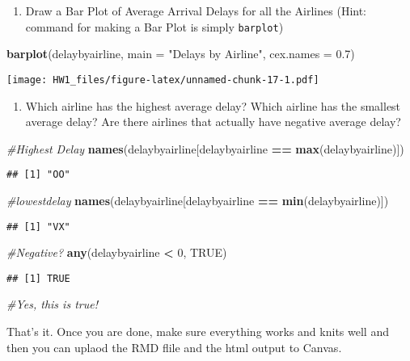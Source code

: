 \documentclass[]{article}
\newenvironment{Shaded}{\begin{snugshade}}{\end{snugshade}}
\newcommand{\KeywordTok}[1]{\textcolor[rgb]{0.13,0.29,0.53}{\textbf{#1}}}
\newcommand{\DataTypeTok}[1]{\textcolor[rgb]{0.13,0.29,0.53}{#1}}
\newcommand{\DecValTok}[1]{\textcolor[rgb]{0.00,0.00,0.81}{#1}}
\newcommand{\FloatTok}[1]{\textcolor[rgb]{0.00,0.00,0.81}{#1}}
\newcommand{\StringTok}[1]{\textcolor[rgb]{0.31,0.60,0.02}{#1}}
\newcommand{\CommentTok}[1]{\textcolor[rgb]{0.56,0.35,0.01}{\textit{#1}}}
\newcommand{\OtherTok}[1]{\textcolor[rgb]{0.56,0.35,0.01}{#1}}
\newcommand{\OperatorTok}[1]{\textcolor[rgb]{0.81,0.36,0.00}{\textbf{#1}}}
\newcommand{\NormalTok}[1]{#1}
\providecommand{\tightlist}{%
  \setlength{\itemsep}{0pt}\setlength{\parskip}{0pt}}
\begin{document}
\begin{enumerate}
\def\labelenumi{\alph{enumi})}
\setcounter{enumi}{1}
\tightlist
\item
  Draw a Bar Plot of Average Arrival Delays for all the Airlines (Hint:
  command for making a Bar Plot is simply \texttt{barplot})
\end{enumerate}

\begin{Shaded}
\begin{Highlighting}[]
\KeywordTok{barplot}\NormalTok{(delaybyairline, }\DataTypeTok{main =} \StringTok{"Delays by Airline"}\NormalTok{, }\DataTypeTok{cex.names =} \FloatTok{0.7}\NormalTok{)}
\end{Highlighting}
\end{Shaded}

\texttt{[image: HW1\_files/figure-latex/unnamed-chunk-17-1.pdf]}

\begin{enumerate}
\def\labelenumi{\alph{enumi})}
\setcounter{enumi}{2}
\tightlist
\item
  Which airline has the highest average delay? Which airline has the
  smallest average delay? Are there airlines that actually have negative
  average delay?
\end{enumerate}

\begin{Shaded}
\begin{Highlighting}[]
\CommentTok{#Highest Delay}
\KeywordTok{names}\NormalTok{(delaybyairline[delaybyairline }\OperatorTok{==}\StringTok{ }\KeywordTok{max}\NormalTok{(delaybyairline)])}
\end{Highlighting}
\end{Shaded}

\begin{verbatim}
## [1] "OO"
\end{verbatim}

\begin{Shaded}
\begin{Highlighting}[]
\CommentTok{#lowestdelay}
\KeywordTok{names}\NormalTok{(delaybyairline[delaybyairline }\OperatorTok{==}\StringTok{ }\KeywordTok{min}\NormalTok{(delaybyairline)])}
\end{Highlighting}
\end{Shaded}

\begin{verbatim}
## [1] "VX"
\end{verbatim}

\begin{Shaded}
\begin{Highlighting}[]
\CommentTok{#Negative?}
\KeywordTok{any}\NormalTok{(delaybyairline }\OperatorTok{<}\StringTok{ }\DecValTok{0}\NormalTok{, }\OtherTok{TRUE}\NormalTok{)}
\end{Highlighting}
\end{Shaded}

\begin{verbatim}
## [1] TRUE
\end{verbatim}

\begin{Shaded}
\begin{Highlighting}[]
\CommentTok{#Yes, this is true!}
\end{Highlighting}
\end{Shaded}

That's it. Once you are done, make sure everything works and knits well
and then you can uplaod the RMD flile and the html output to Canvas.
\end{document}
